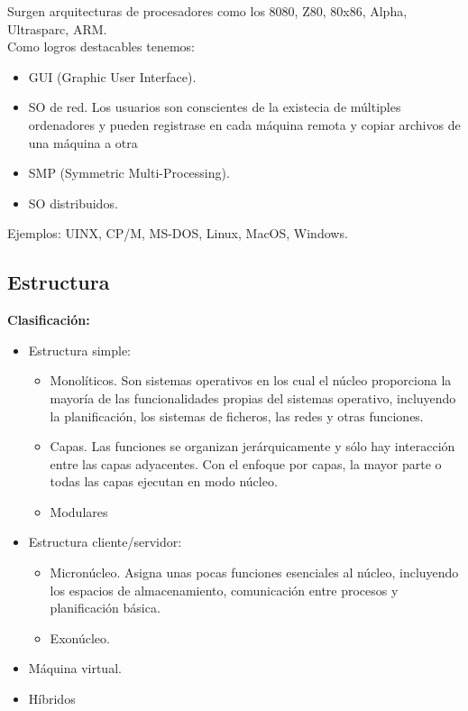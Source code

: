 \documentclass{article}
\begin{document}
Surgen arquitecturas de procesadores como los 8080, Z80, 80x86, Alpha, Ultrasparc, ARM.\\

Como logros destacables tenemos:
\begin{itemize}
\item GUI (Graphic User Interface).

\item SO de red. Los usuarios son conscientes de la existecia de múltiples ordenadores y pueden registrase en cada máquina remota y copiar archivos de una máquina a otra

\item SMP (Symmetric Multi-Processing).

\item SO distribuidos.
\end{itemize}

Ejemplos: UINX, CP/M, MS-DOS, Linux, MacOS, Windows.\\


\subsection{Estructura}
\textbf{Clasificación:}
\begin{itemize}
\item Estructura simple:
	\begin{itemize}
	\item Monolíticos. Son sistemas operativos en los cual el núcleo proporciona la mayoría de las funcionalidades propias del sistemas operativo, incluyendo la planificación, los sistemas de ficheros, las redes y otras funciones.
	
	\item Capas. Las funciones se organizan jerárquicamente y sólo hay interacción entre las capas adyacentes. Con el enfoque por capas, la mayor parte o todas las capas ejecutan en modo núcleo.
	
	\item Modulares
	\end{itemize}

\item Estructura cliente/servidor:
	\begin{itemize}
	\item Micronúcleo. Asigna unas pocas funciones esenciales al núcleo, incluyendo los espacios de almacenamiento, comunicación entre procesos y planificación básica.
	
	\item Exonúcleo.
	\end{itemize}
	
\item Máquina virtual.

\item Híbridos
\end{itemize}
\end{document}
